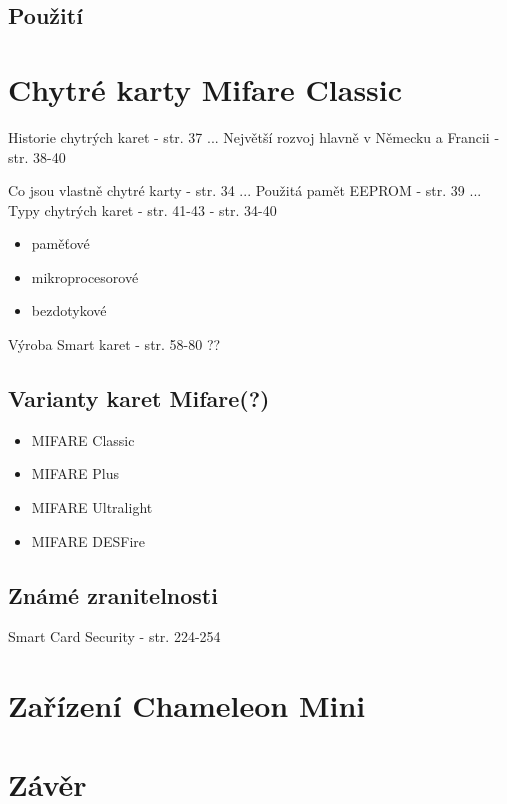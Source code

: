 \section{Použití}

\chapter{Chytré karty Mifare Classic}
\label{chytre_karty_mifare_classic}

Historie chytrých karet \cite{Smart_card_handbook} {-} str. 37 ...
Největší rozvoj hlavně v Německu a Francii\cite{Smart_card_handbook} {-} str. 38-40
\par 
Co jsou vlastně chytré karty \cite{Smart_Cards_Tokens_Security} {-} str. 34 ... 
Použitá pamět EEPROM \cite{Smart_card_handbook} {- str. 39} ... 
Typy chytrých karet\cite{Smart_card_handbook}{ - str. 41-43} \cite{Smart_Cards_Tokens_Security}{ - str. 34-40}

\begin{itemize}
    \item paměťové
    \item mikroprocesorové
    \item bezdotykové
\end{itemize}

\par
Výroba Smart karet \cite{Smart_Cards_Tokens_Security}{ - str. 58-80} ??

\section{Varianty karet Mifare(?)}

\begin{itemize}
  \item MIFARE Classic 
  \item MIFARE Plus
  \item MIFARE Ultralight 
  \item MIFARE DESFire
\end{itemize}

\section{Známé zranitelnosti}

Smart Card Security \cite{Smart_Cards_Tokens_Security}{ - str. 224-254}

\chapter{Zařízení Chameleon Mini}
\label{zarizeni_chameleon_mini}







\chapter{Závěr}
\label{zaver}


